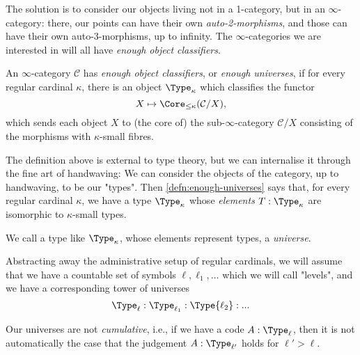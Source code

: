 \begin{node}
%
The solution is to consider our objects living not in a 1-category, but
in an \(\infty\)-category: there, our
points can have their own \emph{auto-2-morphisms}, and those can have
their own auto-3-morphisms, up to infinity. The \(\infty\)-categories we
are interested in will all have \emph{enough object classifiers}.
%
\end{node}

\begin{defn}\label{defn:enough-universes}
An \(\infty\)-category \(\mathcal{C}\) has \emph{enough object
classifiers}, or \emph{enough universes}, if for every regular cardinal
\(\kappa\), there is an object \(\Type_\kappa\) which classifies the
functor
\[
X \mapsto \Core_{\le \kappa}(\mathcal{C}/X),
\]
which sends each object \(X\) to (the core of) the
sub-\(\infty\)-category \(\mathcal{C}/X\) consisting of the morphisms
with \(\kappa\)-small fibres.
\end{defn}

\begin{node}
%
The definition above is external to type theory, but we can internalise
it through the fine art of handwaving: We can consider the objects of the
category, up to handwaving, to be our "types". Then
\cref{defn:enough-universes} says that, for every regular cardinal
\(\kappa\), we have a type \(\Type_\kappa\) whose \emph{elements} \(T :
\Type_\kappa\) are isomorphic to \(\kappa\)-small types.

We call a type like \(\Type_\kappa\), whose elements represent types, a
\emph{universe}.
%
\end{node}

\begin{node}
%
Abstracting away the administrative setup of regular cardinals, we will
assume that we have a countable set of symbols \(\ell, \ell_1, \dots\)
which we will call "levels", and we have a corresponding tower of
universes
\[
  \Type_{\ell} : \Type_{\ell_1} : \Type{\ell_2} : ...
\]
%
\end{node}

\begin{remark}
Our universes are not \emph{cumulative}, i.e., if we have a code \(A :
\Type_{\ell}\), then it is not automatically the case that the judgement
\(A : \Type_{\ell'}\) holds for \(\ell' > \ell\).
\end{remark}

